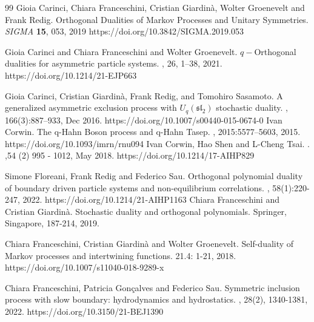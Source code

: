 \documentclass{ximera}
\begin{document}
\begin{thebibliography}{99}
Gioia Carinci, Chiara Franceschini, Cristian Giardin\`{a}, Wolter Groenevelt and Frank Redig.
\newblock
Orthogonal Dualities of Markov Processes and Unitary Symmetries.
\newblock
{\em SIGMA} \textbf{15}, 053, 2019
  https://doi.org/10.3842/SIGMA.2019.053

Gioia Carinci and Chiara Franceschini and Wolter Groenevelt.
\newblock
 {{$q-$Orthogonal dualities for asymmetric particle systems}}.
 , 26, 1--38, 2021.
https://doi.org/10.1214/21-EJP663

Gioia Carinci, Cristian Giardin{\`a}, Frank Redig, and Tomohiro Sasamoto.
\newblock A generalized asymmetric exclusion process with
  ${U}_q(\mathfrak{sl}_2)$ stochastic duality.
, 166(3):887--933, Dec
  2016. https://doi.org/10.1007/s00440-015-0674-0
Ivan Corwin.
\newblock The q-{H}ahn {B}oson process and q-{H}ahn {T}asep.
, 2015:5577--5603,
  2015.
 https://doi.org/10.1093/imrn/rnu094
Ivan Corwin, Hao Shen and L-Cheng Tsai.
.
,54 (2) 995 - 1012, May 2018. https://doi.org/10.1214/17-AIHP829

Simone Floreani, Frank Redig and Federico Sau.
\newblock Orthogonal polynomial duality of boundary driven particle systems and non-equilibrium correlations.
, 58(1):220-247, 2022.
https://doi.org/10.1214/21-AIHP1163
Chiara Franceschini and Cristian Giardin{\`a}.
\newblock Stochastic duality and orthogonal polynomials.
 Springer, Singapore, 187-214, 2019.

 

Chiara Franceschini, Cristian Giardin{\`a} and Wolter Groenevelt.
\newblock Self-duality of Markov processes and intertwining functions.
 21.4: 1-21, 2018.
https://doi.org/10.1007/s11040-018-9289-x

Chiara Franceschini, Patricia Gonçalves and Federico Sau.
\newblock Symmetric inclusion process with slow boundary: hydrodynamics and hydrostatics. 
, 28(2), 1340-1381, 2022.
https://doi.org/10.3150/21-BEJ1390



\end{thebibliography}
\end{document}
